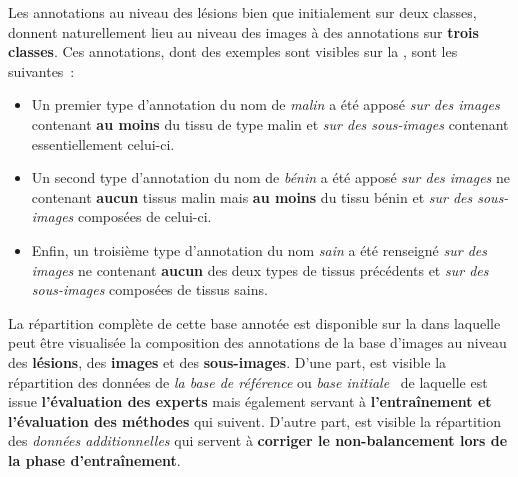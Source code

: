 Les annotations au niveau des lésions bien que initialement sur deux classes, donnent naturellement lieu au niveau des images à des annotations sur \textbf{trois classes}. Ces annotations, dont des exemples sont visibles sur la , sont les suivantes~:
\begin{itemize}
    \item Un premier type d'annotation du nom de \textit{malin} a été apposé \textit{sur des images} contenant \textbf{au moins} du tissu de type malin et \textit{sur des sous-images} contenant essentiellement celui-ci.
    \item Un second type d'annotation du nom de \textit{bénin} a été apposé \textit{sur des images} ne contenant \textbf{aucun} tissus malin mais \textbf{au moins} du tissu bénin et \textit{sur des sous-images} composées de celui-ci.
    \item  Enfin, un troisième type d'annotation du nom \textit{sain} a été renseigné \textit{sur des images} ne contenant \textbf{aucun} des deux types de tissus précédents et \textit{sur des sous-images} composées de tissus sains. 
\end{itemize}\par

La répartition complète de cette base annotée est disponible sur la  dans laquelle peut être visualisée la composition des annotations de la base d'images au niveau des \textbf{lésions}, des \textbf{images} et des \textbf{sous-images}. D'une part, est visible la répartition des données de \textit{la base de référence} ou \textit{base initiale}~\cite{Cinotti2018} de laquelle est issue \textbf{l'évaluation des experts} mais également servant à \textbf{l'entraînement et l'évaluation des méthodes} qui suivent. D'autre part, est visible la répartition des \textit{données additionnelles} qui servent à \textbf{corriger le non-balancement lors de la phase d'entraînement}.\par

